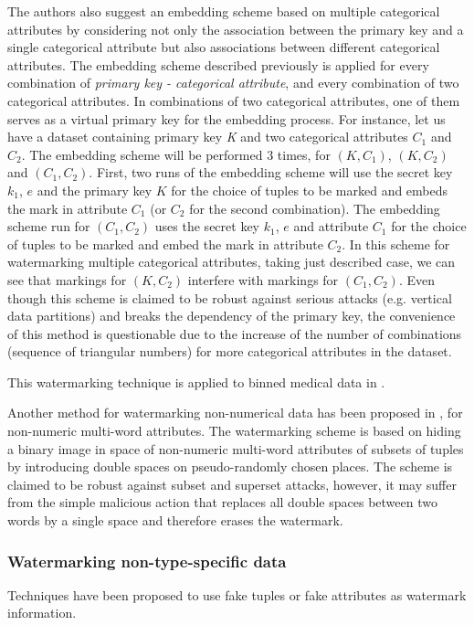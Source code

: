 The authors also suggest an embedding scheme based on multiple categorical attributes by considering not only the association between the primary key and a single categorical attribute but also associations between different categorical attributes. 
The embedding scheme described previously is applied for every combination of \textit{primary key - categorical attribute}, and every combination of two categorical attributes. In combinations of two categorical attributes, one of them serves as a virtual primary key for the embedding process. 
For instance, let us have a dataset containing primary key \textit{K} and two categorical attributes $C_1$ and $C_2$. 
The embedding scheme will be performed 3 times, for $(K,C_1)$, $(K,C_2)$ and $(C_1,C_2)$. 
First, two runs of the embedding scheme will use the secret key $k_1$, $e$ and the primary key $K$ for the choice of tuples to be marked and embeds the mark in attribute $C_1$ (or $C_2$ for the second combination).
The embedding scheme run for $(C_1,C_2)$ uses the secret key $k_1$, $e$ and attribute $C_1$ for the choice of tuples to be marked and embed the mark in attribute $C_2$.
In this scheme for watermarking multiple categorical attributes, taking just described case, we can see that markings for $(K,C_2)$ interfere with markings for $(C_1,C_2)$. 
Even though this scheme is claimed to be robust against serious attacks (e.g. vertical data partitions) and breaks the dependency of the primary key, the convenience of this method is questionable due to the increase of the number of combinations (sequence of triangular numbers) for more categorical attributes in the dataset.

This watermarking technique is applied to binned medical data in \cite{bertino2005privacy}.

Another method for watermarking non-numerical data has been proposed in \cite{al2008robust}, for non-numeric multi-word attributes. The watermarking scheme is based on hiding a binary image in space of non-numeric multi-word attributes of subsets of tuples by introducing double spaces on pseudo-randomly chosen places. The scheme is claimed to be robust against subset and superset attacks, however, it may suffer from the simple malicious action that replaces all double spaces between two words by a single space and therefore erases the watermark.  

\subsubsection{Watermarking non-type-specific data}
Techniques have been proposed to use fake tuples \cite{pournaghshband2008new} or fake attributes \cite{prasannakumari2009robust} as watermark information. 

